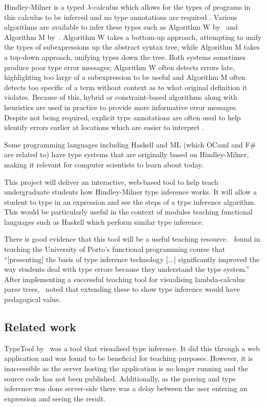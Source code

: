 \documentclass[a4paper,fleqn,12pt]{article}
\begin{document}
Hindley-Milner is a typed $\lambda$-calculus which allows for the types of programs in this calculus to be inferred and no type annotations are required \citep{ref2,ref3}. Various algorithms are available to infer these types such as Algorithm W by~\cite{ref3} and Algorithm M by~\cite{ref5}. Algorithm W takes a bottom-up approach, attempting to unify the types of subexpressions up the abstract syntax tree, while Algorithm M takes a top-down approach, unifying types down the tree. Both systems sometimes produce poor type error messages; Algorithm W often detects errors late, highlighting too large of a subexpression to be useful and Algorithm M often detects too specific of a term without context as to what original definition it violates. Because of this, hybrid or constraint-based algorithms along with heuristics are used in practice to provide more informative error messages. Despite not being required, explicit type annotations are often used to help identify errors earlier at locations which are easier to interpret \citep{ref6}.

Some programming languages including Haskell and ML (which OCaml and F\# are related to) have type systems that are originally based on Hindley-Milner, making it relevant for computer scientists to learn about today.

This project will deliver an interactive, web-based tool to help teach undergraduate students how Hindley-Milner type inference works. It will allow a student to type in an expression and see the steps of a type inference algorithm. This would be particularly useful in the context of modules teaching functional languages such as Haskell which perform similar type inference.

There is good evidence that this tool will be a useful teaching resource.~\cite{ref7} found in teaching the University of Porto’s functional programming course that “[presenting] the basis of type inference technology [...] significantly improved the way students deal with type errors because they understand the type system.” After implementing a successful teaching tool for visualising lambda-calculus parse trees,~\cite{ref8} noted that extending these to show type inference would have pedagogical value.

\subsection{Related work}\label{id:h.2mwaav7jkal4}

TypeTool by~\cite{ref7} was a tool that visualised type inference. It did this through a web application and was found to be beneficial for teaching purposes. However, it is inaccessible as the server hosting the application is no longer running and the source code has not been published. Additionally, as the parsing and type inference was done server-side there was a delay between the user entering an expression and seeing the result.
\end{document}
